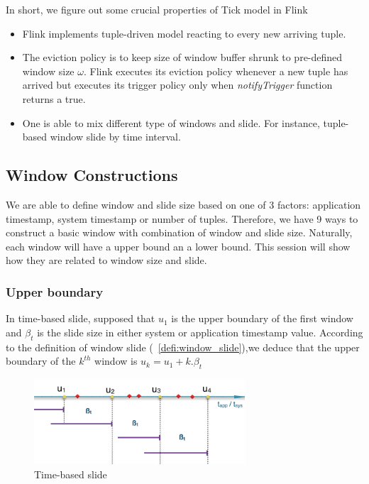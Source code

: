 In short, we figure out some crucial properties of Tick model in Flink
\begin{itemize}
\item Flink implements tuple-driven model reacting to every new arriving tuple.
\item The eviction policy is to keep size of window buffer shrunk to pre-defined window size $\omega$. Flink executes its eviction policy whenever a new tuple has arrived but executes its trigger policy only when \textit{notifyTrigger} function returns a true.
\item One is able to mix different type of windows and slide. For instance, tuple-based window slide by time interval.
\end{itemize}



\subsection{Window Constructions}
We are able to define window and slide size based on one of 3 factors: application timestamp, system timestamp or number of tuples. Therefore, we have 9 ways to construct a basic window with combination of window and slide size. Naturally, each window will have a upper bound an a lower bound. This session will show how they are related to window size and slide.

\subsubsection{Upper boundary}
In time-based slide,  supposed that $u_1$ is  the upper boundary of the first window and $\beta_t$ is the slide size in either system or application timestamp value. According to the definition of window slide (~\ref{defi:window_slide}),we deduce that the upper boundary of the $k^{th}$ window is $u_k = u_1 + k.\beta_t$

\begin{figure}[htbp!] 
\centering    
\includegraphics[width=0.7\textwidth]{timebased_slide}
\caption{Time-based slide}
\label{fig:timebased_slide}
\end{figure}

